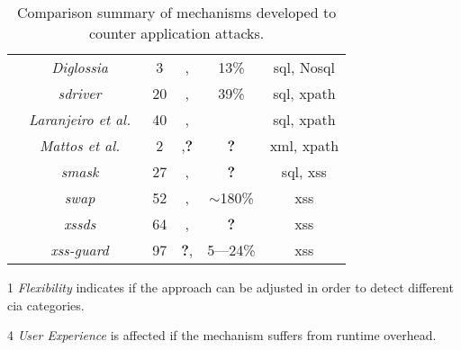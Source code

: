 \documentclass[conference]{IEEEtran}
\newcommand{\tick}{\ding{52}}
\newcommand{\xmark}{\ding{56}}
\begin{document}
\begin{table*}
\begin{threeparttable}
\begin{small}
{\begin{tabular}{l|c|c|cc|c}
	& 	{\it Diglossia}~\cite{SMS13} & 3 & \xmark,\xmark  & 13\% & {\sc sql}, No{\sc sql} \\
	& 	{\it {\sc sd}river}~\cite{MS09,MKS09} & 20 & \tick,\tick & 39\% & {\sc sql}, {\sc xp}ath \\
	& 	{\it Laranjeiro et al.}~\cite{LVM09,ALVM09,LVM10} & 40 & \xmark,\xmark  & \xmark & {\sc sql}, {\sc xp}ath \\
	& 	{\it Mattos et al.}~\cite{MSM13} & 2 & \tick,{\bf ?} &  {\bf ?} & {\sc xml}, {\sc xp}ath \\
	& 	{\it {\sc sm}ask}~\cite{JB07} & 27 & \xmark,\xmark & {\bf ?} & {\sc sql}, {\sc xss} \\
	& 	{\it {\sc swap}}~\cite{WPLKK09} & 52 & \tick,\tick & $\sim$180\% & {\sc xss} \\ 
    & 	{\it {\sc xssds}}~\cite{JEP08} & 64 & \xmark,\xmark & {\bf ?} &  {\sc xss} \\
    & 	{\it {\sc xss-guard}}~\cite{BV08} & 97 & {\bf ?},\xmark & 5---24\% & {\sc xss} \\
	\hline
    \end{tabular}}
    \begin{tablenotes}
	\begin{footnotesize}
       \item[1] {\it Flexibility} indicates if the approach can be adjusted
	in order to detect different {\sc cia} categories.
       \item[4] {\it User Experience} is affected if the mechanism suffers
	from runtime overhead.
	\end{footnotesize}
    \end{tablenotes}
    \caption{Comparison summary of mechanisms developed to counter application attacks.}
    \label{tab:comp2}
    \end{small}
    \end{threeparttable}
\end{table*}



\end{document}

